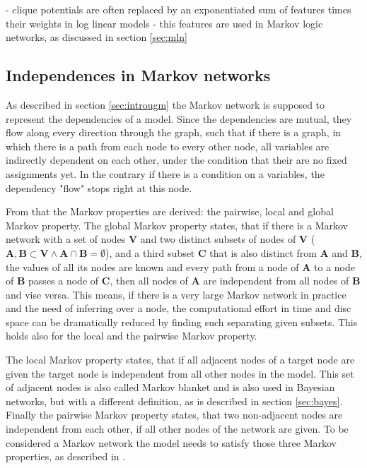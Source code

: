 - clique potentials are often replaced by an exponentiated sum of features times their weights in log linear models
- this features are used in Markov logic networks, as discussed in section \ref{sec:mln}

\subsection{Independences in Markov networks} \label{sec:indep}

As described in section \ref{sec:introugm} the Markov network is supposed to represent the dependencies of a model. Since the dependencies are mutual, they flow along every direction through the graph, such that if there is a graph, in which there is a path from each node to every other node, all variables are indirectly dependent on each other, under the condition that their are no fixed assignments yet. In the contrary if there is a condition on a variables, the dependency "flow" stops right at this node.

From that the Markov properties are derived: the pairwise, local and global Markov property. The global Markov property states, that if there is a Markov network with a set of nodes $\mathbf{V}$ and two distinct subsets of nodes of $\mathbf{V}$ ($\mathbf{A}, \mathbf{B} \subset \mathbf{V} \wedge \mathbf{A} \cap \mathbf{B} = \emptyset$), and a third subset $\mathbf{C}$ that is also distinct from $\mathbf{A}$ and $\mathbf{B}$, the values of all its nodes are known and every path from a node of $\mathbf{A}$ to a node of $\mathbf{B}$ passes a node of $\mathbf{C}$, then all nodes of $\mathbf{A}$ are independent from all nodes of $\mathbf{B}$ and vise versa. This means, if there is a very large Markov network in practice and the need of inferring over a node, the computational effort in time and disc space can be dramatically reduced by finding such separating given subsets. This holds also for the local and the pairwise Markov property.

The local Markov property states, that if all adjacent nodes of a target node are given the target node is independent from all other nodes in the model. This set of adjacent nodes is also called Markov blanket and is also used in Bayesian networks, but with a different definition, as is described in section \ref{sec:bayes}. Finally the pairwise Markov property states, that two non-adjacent nodes are independent from each other, if all other nodes of the network are given. To be considered a Markov network the model needs to satisfy those three Markov properties, as described in \cite{markov1957theory}.


